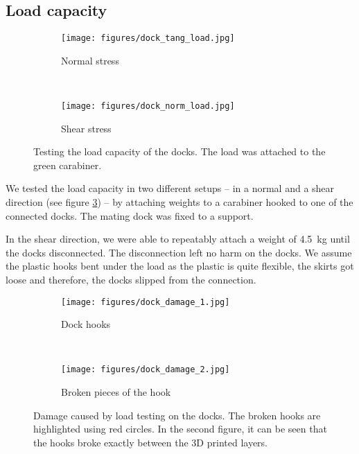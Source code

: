 \subsection{Load capacity}

\begin{figure}[t!]
    \centering
    \begin{subfigure}[b]{0.45\textwidth}
        \texttt{[image: figures/dock\_tang\_load.jpg]}
        \caption{Normal stress}
        \label{fig:dock_test_tang}
    \end{subfigure}
    ~
    \begin{subfigure}[b]{0.45\textwidth}
        \texttt{[image: figures/dock\_norm\_load.jpg]}
        \caption{Shear stress}
        \label{fig:dock_test_norm}
    \end{subfigure}
    \caption{Testing the load capacity of the docks. The load was attached to
    the green carabiner.}
    \label{fig:dock_test_load}
\end{figure}

We tested the load capacity in two different setups -- in a normal and a
shear direction (see figure \ref{fig:dock_test_load}) -- by attaching weights
to a carabiner hooked to one of the connected docks. The mating dock was fixed
to a support.

In the shear direction, we were able to repeatably attach a weight of 4.5~kg
until the docks disconnected. The disconnection left no harm on the docks. We
assume the plastic hooks bent under the load as the plastic is quite flexible,
the skirts got loose and therefore, the docks slipped from the connection.

\begin{figure}[t!]
    \centering
    \begin{subfigure}[b]{0.45\textwidth}
        \texttt{[image: figures/dock\_damage\_1.jpg]}
        \caption{Dock hooks}
    \end{subfigure}
    ~
    \begin{subfigure}[b]{0.45\textwidth}
        \texttt{[image: figures/dock\_damage\_2.jpg]}
        \caption{Broken pieces of the hook}
    \end{subfigure}
    \caption{Damage caused by load testing on the docks. The broken hooks are
    highlighted using red circles. In the second figure, it can be seen that the
    hooks broke exactly between the 3D printed layers.}
    \label{fig:dock_damage}
\end{figure}

